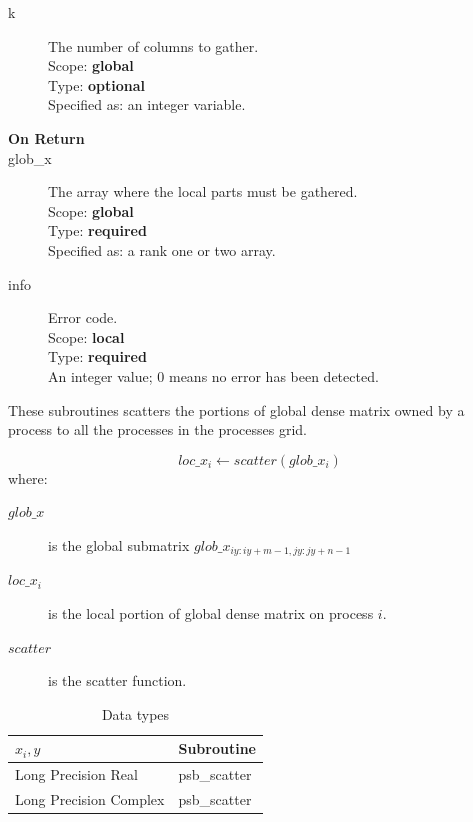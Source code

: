 \begin{description}
\item[k]  The number of columns to gather.\\
Scope: {\bf global} \\
Type: {\bf optional}\\
Specified as: an integer variable. 
\item[\bf On Return] 
\item[glob\_x] The array where the local parts must be gathered.\\
Scope: {\bf global} \\
Type: {\bf required}\\
Specified as: a rank one or two array.
\item[info] Error code.\\
Scope: {\bf local} \\
Type: {\bf required} \\
An integer value; 0 means no error has been detected. 
\end{description}

%
%


These subroutines scatters the portions of global dense matrix owned
by a process to all the processes in the processes grid.

\[ loc\_x_i \leftarrow scatter(glob\_x_i) \]
where:
\begin{description}
\item[$glob\_x$] is the global submatrix $glob\_x_{iy:iy+m-1,jy:jy+n-1}$
\item[$loc\_x_i$] is the local portion of global dense matrix on
process $i$.
\item[$scatter$] is the scatter function.
\end{description}

\begin{table}[h]
\begin{center}
\begin{tabular}{ll}
\hline
$x_i, y$ & {\bf Subroutine}\\
\hline
Long Precision Real & psb\_scatter \\
Long Precision Complex & psb\_scatter \\
\hline
\end{tabular}
\end{center}
\caption{Data types\label{tab:scatter}}
\end{table}

